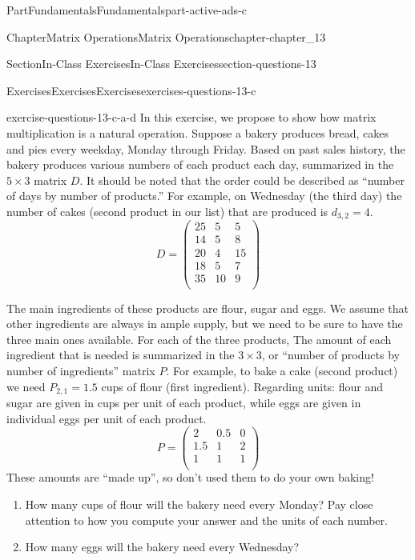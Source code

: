 \documentclass[oneside,10pt,]{book}
\numberwithin{equation}{section}
\begin{document}
\begin{partptx}{Part}{Fundamentals}{}{Fundamentals}{}{}{part-active-ads-c}
\begin{chapterptx}{Chapter}{Matrix Operations}{}{Matrix Operations}{}{}{chapter-chapter_13}
\begin{sectionptx}{Section}{In-Class Exercises}{}{In-Class Exercises}{}{}{section-questions-13}
\begin{exercises-subsection-numberless}{Exercises}{Exercises}{}{Exercises}{}{}{exercises-questions-13-c}
\begin{exercisegroup}
\begin{divisionexerciseeg}{4}{}{}{exercise-questions-13-c-a-d}
In this exercise, we propose to show how matrix multiplication is a natural operation.  Suppose a bakery produces bread, cakes and pies every weekday, Monday through Friday. Based on past sales history, the bakery produces various numbers of each product each day, summarized in the \(5 \times 3\) matrix \(D\).  It should be noted that the order could be described as ``number of days by number of products.''   For example, on Wednesday (the third day) the number of cakes (second product in our list) that are produced  is  \(d_{3,2} = 4\).%
\begin{equation*}
D =\left(
\begin{array}{ccc}
25 & 5 & 5 \\
14 & 5 & 8 \\
20 & 4 & 15 \\
18 & 5 & 7 \\
35 & 10 & 9 \\
\end{array}
\right)
\end{equation*}
%
\par
The main ingredients of these products are flour, sugar and eggs. We assume that other ingredients are always in ample supply, but we need to be sure to have the three main ones available.   For each of the three products, The amount of each ingredient that is needed is summarized in the \(3 \times 3\), or ``number of products by number of ingredients'' matrix \(P\).  For example, to bake a cake (second product) we need \(P_{2,1}=1.5\) cups of flour (first ingredient).  Regarding units: flour and sugar are given in cups per unit of each product, while eggs are given in individual eggs per unit of each product.%
\begin{equation*}
P =\left(
\begin{array}{ccc}
2 & 0.5 & 0 \\
1.5 & 1 & 2 \\
1 & 1 & 1  \\
\end{array}
\right)
\end{equation*}
These amounts are ``made up'', so don't used them to do your own baking!%
\par
%
\begin{enumerate}[label=(\alph*)]
\item{}How many cups of flour will the bakery need every Monday?  Pay close attention to how you compute your answer and the units of each number.%
\item{}How many eggs will the bakery need every Wednesday?%

\end{enumerate}
\end{divisionexerciseeg}
\end{exercisegroup}
\end{exercises-subsection-numberless}
\end{sectionptx}
\end{chapterptx}
\end{partptx}
\end{document}
